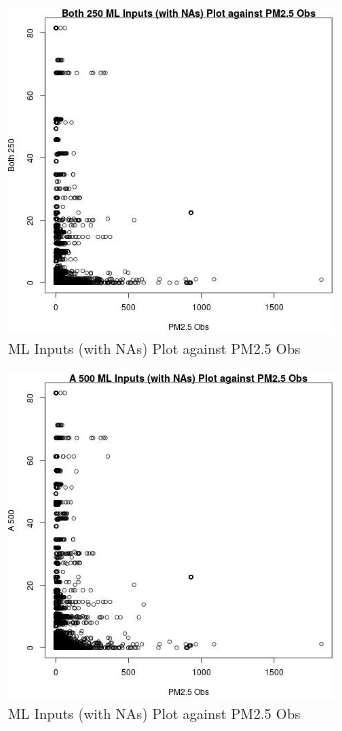 \begin{figure} 
\centering  
\includegraphics[width=0.77\textwidth]{Code_Outputs/Report_ML_input_PM25_Step4_part_e_de_duplicated_aveswNAs_Both_250vPM25_Obs.jpg} 
\caption{\label{fig:Report_ML_input_PM25_Step4_part_e_de_duplicated_aveswNAsBoth_250vPM25_Obs}ML Inputs (with NAs) Plot against PM2.5 Obs} 
\end{figure} 
 

\clearpage 

\begin{figure} 
\centering  
\includegraphics[width=0.77\textwidth]{Code_Outputs/Report_ML_input_PM25_Step4_part_e_de_duplicated_aveswNAs_A_500vPM25_Obs.jpg} 
\caption{\label{fig:Report_ML_input_PM25_Step4_part_e_de_duplicated_aveswNAsA_500vPM25_Obs}ML Inputs (with NAs) Plot against PM2.5 Obs} 
\end{figure} 
 

